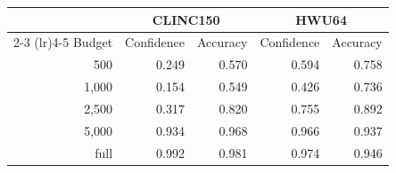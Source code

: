 \begin{tabular}{rrrrr}
\toprule
 & \multicolumn{2}{c}{CLINC150} & \multicolumn{2}{c}{HWU64} \\
\cmidrule(lr){2-3} \cmidrule(lr){4-5}
Budget & Confidence & Accuracy & Confidence & Accuracy \\
\midrule
500 & 0.249 & 0.570 & 0.594 & 0.758 \\
1{,}000 & 0.154 & 0.549 & 0.426 & 0.736 \\
2{,}500 & 0.317 & 0.820 & 0.755 & 0.892 \\
5{,}000 & 0.934 & 0.968 & 0.966 & 0.937 \\
full & 0.992 & 0.981 & 0.974 & 0.946 \\
\bottomrule
\end{tabular}
